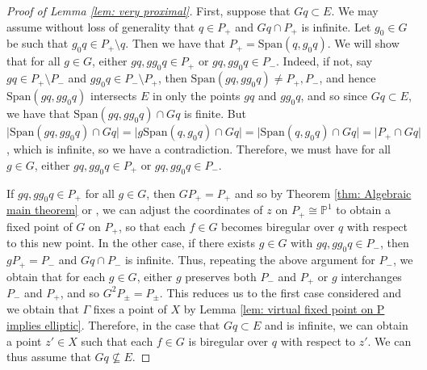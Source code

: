 \documentclass[12pt]{article}
\theoremstyle{definition}
\begin{document}
\begin{proof} [Proof of Lemma \ref{lem: very proximal}]
            First, suppose that $Gq \subset E$. We may assume without loss of generality that $q \in P_+$ and $Gq \cap P_+$ is infinite. Let $g_0 \in G$ be such that $g_0 q \in P_+ \setminus q$. Then we have that $P_+ = \mathrm{Span}(q, g_0q)$. We will show that for all $g \in G$, either $gq, gg_0q \in P_+$ or $gq, gg_0q \in P_-$. Indeed, if not, say $gq \in P_+ \setminus P_-$ and $gg_0 q \in P_- \setminus P_+$, then $\mathrm{Span}(gq, gg_0q) \neq P_+, P_-$, and hence $\mathrm{Span}(gq, gg_0q)$ intersects $E$ in only the points $gq$ and $gg_0q$, and so since $Gq \subset E$, we have that $\mathrm{Span}(gq, gg_0q) \cap Gq$ is finite. But $\vert \mathrm{Span}(gq, gg_0q) \cap Gq \vert = \vert g \mathrm{Span}(q,g_0q) \cap Gq \vert = \vert \mathrm{Span}(q,g_0q) \cap Gq\vert = \vert P_+ \cap Gq\vert$, which is infinite, so we have a contradiction. Therefore, we must have for all $g \in G$, either $gq, gg_0q \in P_+$ or $gq, gg_0q \in P_-$. 
             
             If $gq, gg_0q \in P_+$ for all $g \in G$, then $GP_+ = P_+$ and so by Theorem \ref{thm: Algebraic main theorem} or \cite[Lemma 4.9]{Algebraic}, we can adjust the coordinates of $z$ on $P_+ \cong \mathbb{P}^1$ to obtain a fixed point of $G$ on $P_+$, so that each $f \in G$ becomes biregular over $q$ with respect to this new point. In the other case, if there exists $g \in G$ with $gq, gg_0q \in P_-$, then $g P_+ = P_-$ and $Gq \cap P_-$ is infinite. Thus, repeating the above argument for $P_-$, we obtain that for each $g \in G$, either $g$ preserves both $P_-$ and $P_+$ or $g$ interchanges $P_-$ and $P_+$, and so $G^2 P_\pm = P_\pm$. This reduces us to the first case considered and we obtain that $\Gamma$ fixes a point of $X$ by Lemma \ref{lem: virtual fixed point on P implies elliptic}. Therefore, in the case that $Gq \subset E$ and is infinite, we can obtain a point $z' \in X$ such that each $f \in G$ is biregular over $q$ with respect to $z'$. We can thus assume that $Gq \nsubseteq E$.
             

\end{proof}
\end{document}
